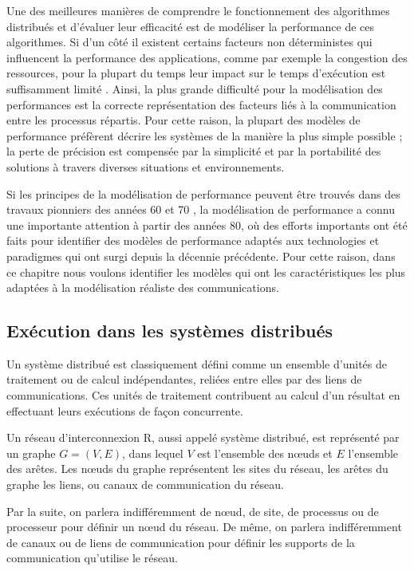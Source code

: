 Une des meilleures manières de comprendre le fonctionnement des algorithmes
distribués et d'évaluer leur efficacité est de modéliser la performance
de ces algorithmes. Si d'un côté il existent certains facteurs non
déterministes qui influencent la performance des applications,
comme par exemple la congestion des ressources, pour la plupart du
temps leur impact sur le temps d'exécution est suffisamment
limité \cite{Grove03}. Ainsi, la plus grande difficulté pour la modélisation
des performances est la correcte représentation des facteurs liés
à la communication entre les processus répartis. Pour cette raison,
la plupart des modèles de performance préfèrent décrire les systèmes
de la manière la plus simple possible ; la perte de précision est
compensée par la simplicité et par la portabilité des solutions à
travers diverses situations et environnements. 

Si les principes de la modélisation de performance peuvent être trouvés
dans des travaux pionniers des années 60 et 70 \cite{Peterson81},
la modélisation de performance a connu une importante attention à
partir des années 80, où des efforts importants ont été faits pour
identifier des modèles de performance adaptés aux technologies et
paradigmes qui ont surgi depuis la décennie précédente. Pour cette
raison, dans ce chapitre nous voulons identifier les modèles qui ont les caractéristiques
les plus adaptées à la modélisation réaliste des communications.


\subsection{Exécution dans les systèmes distribués}

Un système distribué est classiquement défini comme un ensemble
d'unités de traitement ou de calcul indépendantes, reliées entre elles
par des liens de communications. Ces unités de traitement contribuent
au calcul d'un résultat en effectuant leurs exécutions de façon
concurrente.

Un réseau d'interconnexion {\cal R}, aussi appelé système distribué,
est représenté par un graphe $G =(V,E)$, dans lequel $V$ est
l'ensemble des n{\oe}uds et $E$ l'ensemble des arêtes. Les n{\oe}uds
du graphe représentent les sites du réseau, les arêtes du graphe les
liens, ou canaux de communication du réseau.

Par la suite, on parlera indifféremment de n{\oe}ud, de site, de
processus ou de processeur pour définir un n{\oe}ud du réseau. De
même, on parlera indifféremment de canaux ou de liens de communication
pour définir les supports de la communication qu'utilise le réseau.

